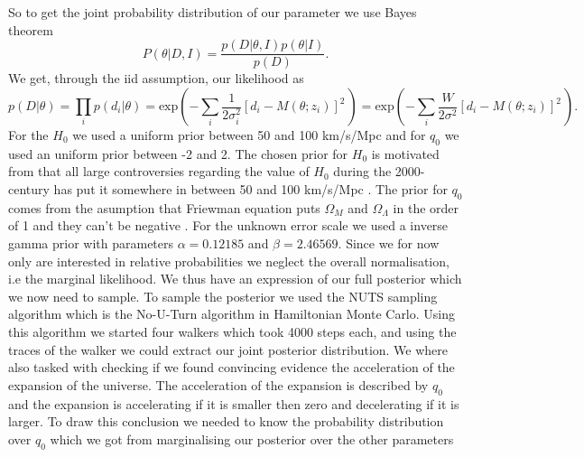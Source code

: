 \documentclass[11pt,a4paper]{article}
\begin{document}
\\\\
So to get the joint probability distribution of our parameter we use Bayes theorem 
\begin{equation*}
    P(\theta| D, I) =  \frac{p(D|\theta, I)p(\theta|I)}{p(D)}.
\end{equation*}
We get, through the iid assumption, our likelihood as
\begin{equation*}
    p(D|\theta) =  \prod_i p(d_i|\theta) = \text{exp}\left(-\sum_i \frac{1}{2\sigma_i^2}\left[d_i - M(\theta;z_i)\right]^2\frac{}{}\right) =  \text{exp}\left(-\sum_i \frac{W}{2\sigma^2}\left[d_i - M(\theta;z_i)\right]^2\frac{}{}\right).
\end{equation*}
For the $H_0$ we used a uniform prior between 50 and 100 km/s/Mpc and for $q_0$ we used an uniform prior between -2 and 2. The chosen prior for $H_0$ is motivated from that all large controversies regarding the value of $H_0$ during the 2000-century has put it somewhere in between 50 and 100 km/s/Mpc \cite{}. The prior for $q_0$ comes from the asumption that Friewman equation puts $\Omega_M$ and $\Omega_\Lambda$ in the order of 1 and they can't be negative \cite{}. For the unknown error scale we used a inverse gamma prior with parameters $\alpha = 0.12185$ and $\beta = 2.46569$. Since we for now only are interested in relative probabilities we neglect the overall normalisation, i.e the marginal likelihood. We thus have an expression of our full posterior which we now need to sample. To sample the posterior we used the NUTS sampling algorithm which is the No-U-Turn algorithm in Hamiltonian Monte Carlo. Using this algorithm we started four walkers which took 4000 steps each, and using the traces of the walker we could extract our joint posterior distribution. We where also tasked with checking if we 
found convincing evidence the acceleration of the expansion of the universe. The acceleration of the expansion is described by $q_0$ and the expansion is accelerating if it is smaller then zero and decelerating if it is larger. To draw this conclusion we needed to know the probability distribution over $q_0$ which we got from marginalising our posterior over the other parameters
\end{document}
